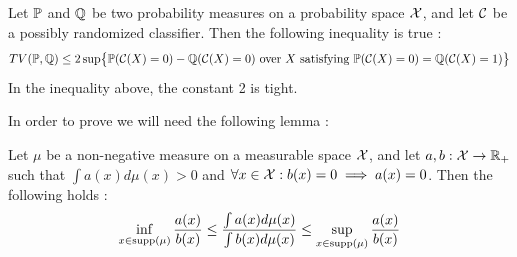 \begin{prop}\label{prop1}\citet[Prop~1]{gerberclas}
    Let $\P$ and $\Q$ be two probability measures on a probability space $\mx$, and let $\mc$ be a possibly randomized classifier. Then the following inequality is true : 
    \begin{equation*}
        TV(\P,\Q) \leq 2\sup \bigl\{\P(\mc(X) =0) -\Q(\mc(X)=0) \text{ over } X \ \text{satisfying} \ \P(\mc(X)=0) = \Q(\mc(X)=1) \bigr\}
    \end{equation*}
    In the inequality above, the constant 2 is tight.
\end{prop}
In order to prove  we will need the following lemma : 
\begin{lemma}\label{sixseven}
    Let $\mu$ be a non-negative measure on a measurable space $\mx$, and let $a,b:\mx\rightarrow\R_+$ such that $\int a(x) d\mu(x) >0$ and $\forall x \in \mx : b(x) = 0 \implies a(x) = 0$. Then the following holds : 
    \begin{equation*}
        \inf_{x \in \supp(\mu)}\frac{a(x)}{b(x)} \leq \frac{\int a(x) d\mu(x)}{\int b(x) d\mu(x)} \leq \sup_{x \in \supp(\mu)}\frac{a(x)}{b(x)}
    \end{equation*}
\end{lemma}
